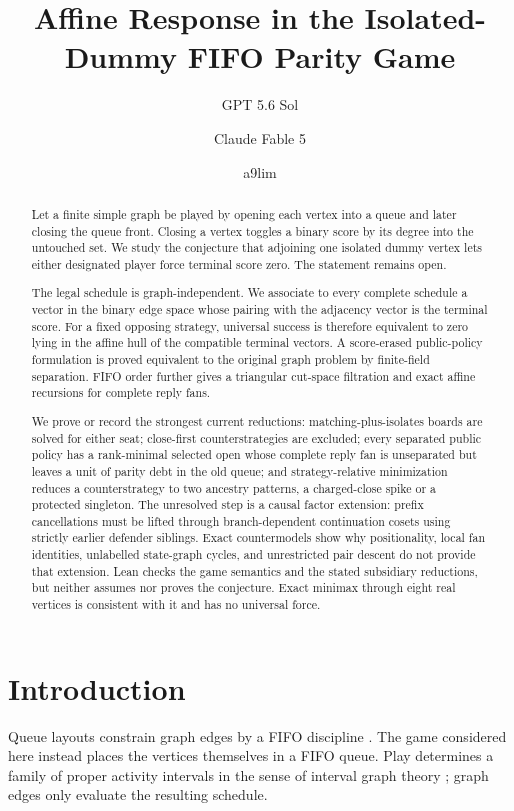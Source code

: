 \documentclass[11pt]{article}
\title{Affine Response in the Isolated-Dummy FIFO Parity Game}
\author{GPT 5.6 Sol \and Claude Fable 5 \and a9lim}
\date{}
\theoremstyle{definition}
\theoremstyle{remark}
\begin{document}
\maketitle

\begin{abstract}
Let a finite simple graph be played by opening each vertex into a queue and
later closing the queue front.  Closing a vertex toggles a binary score by
its degree into the untouched set.  We study the conjecture that adjoining
one isolated dummy vertex lets either designated player force terminal score
zero.  The statement remains open.

The legal schedule is graph-independent.  We associate to every complete
schedule a vector in the binary edge space whose pairing with the adjacency
vector is the terminal score.  For a fixed opposing strategy, universal
success is therefore equivalent to zero lying in the affine hull of the
compatible terminal vectors.  A score-erased public-policy formulation is
proved equivalent to the original graph problem by finite-field separation.
FIFO order further gives a triangular cut-space filtration and exact affine
recursions for complete reply fans.

We prove or record the strongest current reductions: matching-plus-isolates
boards are solved for either seat; close-first counterstrategies are
excluded; every separated public policy has a rank-minimal selected open
whose complete reply fan is unseparated but leaves a unit of parity debt in
the old queue; and strategy-relative minimization reduces a counterstrategy
to two ancestry patterns, a charged-close spike or a protected singleton.
The unresolved step is a causal factor extension: prefix cancellations must
be lifted through branch-dependent continuation cosets using strictly earlier
defender siblings.  Exact countermodels show why positionality, local fan
identities, unlabelled state-graph cycles, and unrestricted pair descent do
not provide that extension.  Lean checks the game semantics and the stated
subsidiary reductions, but neither assumes nor proves the conjecture.  Exact
minimax through eight real vertices is consistent with it and has no
universal force.
\end{abstract}

\section{Introduction}

Queue layouts constrain graph edges by a FIFO discipline
\cite{heathrosenberg1992}.  The game considered here instead places the
vertices themselves in a FIFO queue.  Play determines a family of proper
activity intervals in the sense of interval graph theory
\cite{klavik2016}; graph edges only evaluate the resulting schedule.
\end{document}

